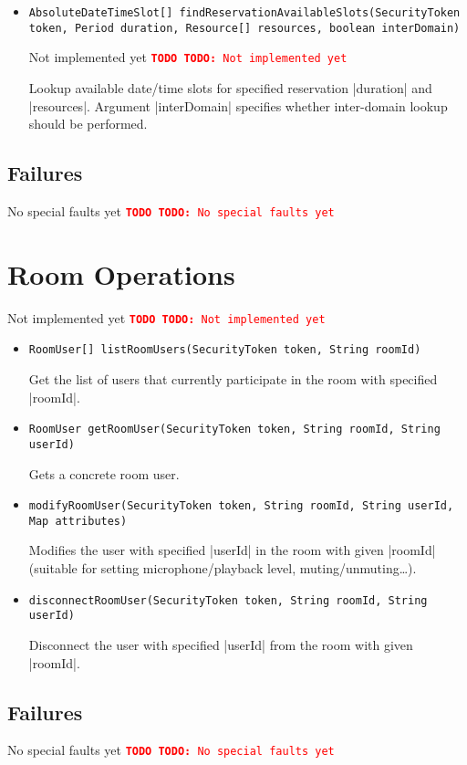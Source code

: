 \documentclass[a4paper]{report}
\newenvironment{Api}{\begin{itemize}}{\end{itemize}}
\newcommand{\ApiCode}[1]{\lstinline[style=styleApi]|#1|}
\newcommand{\ApiItem}[1]{\item #1 %

}
\newcommand{\ApiCmd}[1]{\ApiItem{\ApiCode{#1}}}
\newenvironment{ApiFailures}{\begin{compactitem}}{\end{compactitem}}
\newcommand{\ApiFailure}[1]{\ApiItem{\ApiCode{faultCode = #1}}}
\newcommand{\TODO}[1]{%
\def\empty{}%
\def\prvniparametr{#1}%
\ifx\prvniparametr\empty%
\begingroup\tt\textcolor{red}{\noindent\textbf{TODO}}\endgroup
\else%
\begingroup\tt\textcolor{red}{\noindent\textbf{TODO:}\ #1}\endgroup
\fi%
}
\begin{document}
\begin{Api}
\ApiCmd{AbsoluteDateTimeSlot[] findReservationAvailableSlots(SecurityToken token, Period duration, Resource[] resources, boolean interDomain)}
\TODO{Not implemented yet}
Lookup available date/time slots for specified reservation |duration| and |resources|. Argument |interDomain| specifies whether inter-domain lookup should be performed.

\end{Api}

\subsection{Failures}

\TODO{No special faults yet}


\section{Room Operations}

\TODO{Not implemented yet}

\begin{Api}

\ApiCmd{RoomUser[] listRoomUsers(SecurityToken token, String roomId)}
Get the list of users that currently participate in the room with specified |roomId|.

\ApiCmd{RoomUser getRoomUser(SecurityToken token, String roomId, String userId)}
Gets a concrete room user.

\ApiCmd{modifyRoomUser(SecurityToken token, String roomId, String userId, Map attributes)}
Modifies the user with specified |userId| in the room with given |roomId| (suitable for setting microphone/playback level, muting/unmuting\ldots).

\ApiCmd{disconnectRoomUser(SecurityToken token, String roomId, String userId)}
Disconnect the user with specified |userId| from the room with given |roomId|.

\end{Api}

\subsection{Failures}

\TODO{No special faults yet}
\end{document}
